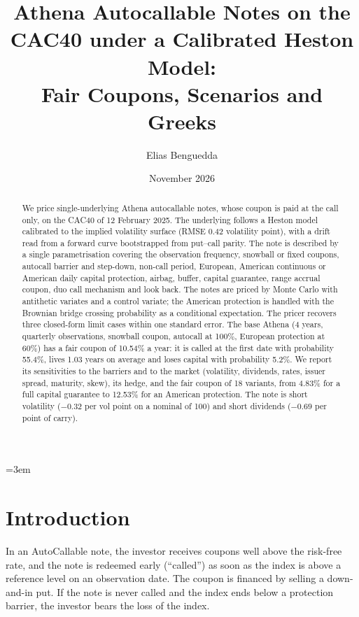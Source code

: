 \documentclass[11pt,a4paper]{article}
\title{Athena Autocallable Notes on the CAC40 under a Calibrated Heston Model:\\
Fair Coupons, Scenarios and Greeks}
\author{Elias Benguedda}
\date{November 2026}
\begin{document}
\emergencystretch=3em
\maketitle

\begin{abstract}
We price single-underlying Athena autocallable notes, whose coupon is paid at the call only, on the CAC40 of
12 February 2025. The underlying follows a Heston model calibrated to the implied volatility surface (RMSE 0.42
volatility point), with a drift read from a forward curve bootstrapped from put--call parity. The note is described
by a single parametrisation covering the observation frequency, snowball or fixed coupons, autocall barrier and
step-down, non-call period, European, American continuous or American daily capital protection, airbag, buffer,
capital guarantee, range accrual coupon, duo call mechanism and look back. The notes are priced by Monte Carlo with
antithetic variates and a control variate; the American protection is handled with the Brownian bridge crossing
probability as a conditional expectation. The pricer recovers three closed-form limit cases within one standard
error. The base Athena (4 years, quarterly observations, snowball coupon, autocall at 100\%, European protection at
60\%) has a fair coupon of 10.54\% a year: it is called at the first date with probability 55.4\%, lives 1.03 years
on average and loses capital with probability 5.2\%. We report its sensitivities to the barriers and to the market
(volatility, dividends, rates, issuer spread, maturity, skew), its hedge, and the fair coupon of 18 variants, from
4.83\% for a full capital guarantee to 12.53\% for an American protection. The note is short volatility ($-0.32$ per
vol point on a nominal of 100) and short dividends ($-0.69$ per point of carry).
\end{abstract}

\clearpage
\tableofcontents
\newpage

\section{Introduction}
In an AutoCallable note, the investor
receives coupons well above the risk-free rate, and the note is redeemed early (``called'') as soon as the index is
above a reference level on an observation date. The coupon is financed by selling a down-and-in put. If the note
is never called and the index ends below a protection barrier, the investor bears the loss of the index.
\end{document}
